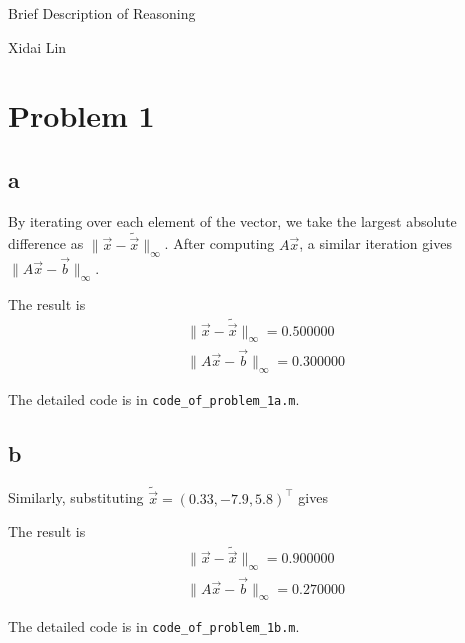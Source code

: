 \documentclass[11pt,a4paper]{report}
\theoremstyle{remark}
\begin{document}
\begin{center}
Brief Description of Reasoning

Xidai Lin
\end{center}

\section*{Problem 1}
\subsection*{a}
By iterating over each element of the vector, we take the largest absolute difference as $\|\vec{x}-\tilde{\vec{x}}\|_\infty$. After computing $A\vec{x}$, a similar iteration gives $\|A\vec{x}-\vec{b}\|_\infty$.

The result is
\begin{align*}
  &\|\vec{x}-\tilde{\vec{x}}\|_\infty=0.500000 \\
&\|A\vec{x}-\vec{b}\|_\infty=0.300000  
\end{align*}



The detailed code is in \texttt{code\_of\_problem\_1a.m}.
\subsection*{b}
Similarly, substituting $\tilde{\vec{x}}=(0.33,-7.9,5.8)^\top$ gives

The result is
\begin{align*}
  &\|\vec{x}-\tilde{\vec{x}}\|_\infty=0.900000 \\
&\|A\vec{x}-\vec{b}\|_\infty=0.270000
\end{align*}

The detailed code is in \texttt{code\_of\_problem\_1b.m}.
\end{document}
